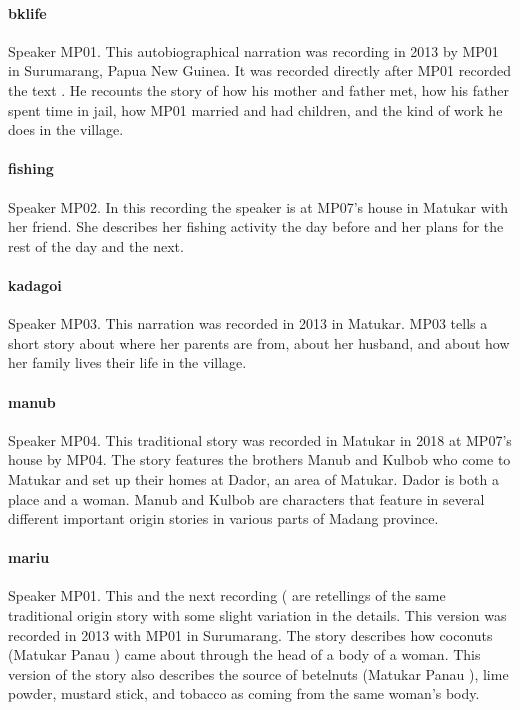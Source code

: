 \paragraph{bklife}
Speaker MP01. This autobiographical narration was recording in 2013 by MP01 in Surumarang, Papua New Guinea. It was recorded directly after MP01 recorded the text . He recounts the story of how his mother and father met, how his father spent time in jail, how MP01 married and had children, and the kind of work he does in the village.

\paragraph{fishing}
Speaker MP02. In this recording the speaker is at MP07's house in Matukar with her friend. She describes her fishing activity the day before and her plans for the rest of the day and the next.

\paragraph{kadagoi}
Speaker MP03. This narration was recorded in 2013 in Matukar. MP03 tells a short story about where her parents are from, about her husband, and about how her family lives their life in the village.

\paragraph{manub}
Speaker MP04. This traditional story was recorded in Matukar in 2018 at MP07's house by MP04. The story features the brothers Manub and Kulbob who come to Matukar and set up their homes at Dador, an area of Matukar. Dador is both a place and a woman. Manub and Kulbob are characters that feature in several different important origin stories in various parts of Madang province.

\paragraph{mariu}
Speaker MP01. This and the next recording ( are retellings of the same traditional origin story with some slight variation in the details. This version was recorded in 2013 with MP01 in Surumarang. The story describes how coconuts (Matukar Panau ) came about through the head of a body of a woman. This version of the story also describes the source of betelnuts (Matukar Panau ), lime powder, mustard stick, and tobacco as coming from the same woman's body.

